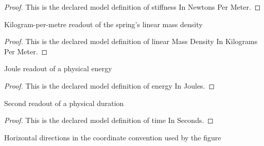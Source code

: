 \begin{proof}
  This is the declared model definition of stiffness In Newtons Per Meter.
\end{proof}
\begin{definition}
  \label{def:physics:phyx-mini-0237:phyxminiproblems-problemphyxmini0237-linearmassdensityinkilogramspermeter}
  Kilogram-per-metre readout of the spring's linear mass density
\end{definition}
\begin{proof}
  This is the declared model definition of linear Mass Density In Kilograms Per Meter.
\end{proof}
\begin{definition}
  \label{def:physics:phyx-mini-0237:phyxminiproblems-problemphyxmini0237-energyinjoules}
  Joule readout of a physical energy
\end{definition}
\begin{proof}
  This is the declared model definition of energy In Joules.
\end{proof}
\begin{definition}
  \label{def:physics:phyx-mini-0237:phyxminiproblems-problemphyxmini0237-timeinseconds}
  Second readout of a physical duration
\end{definition}
\begin{proof}
  This is the declared model definition of time In Seconds.
\end{proof}
\begin{definition}
  \label{def:physics:phyx-mini-0237:phyxminiproblems-problemphyxmini0237-horizontaldirection}
  Horizontal directions in the coordinate convention used by the figure
\end{definition}

